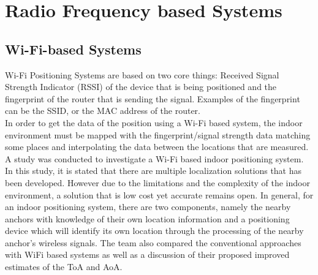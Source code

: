 \documentclass{l4proj}
\begin{document}
\section{Radio Frequency based Systems}
\subsection{Wi-Fi-based Systems}
Wi-Fi Positioning Systems are based on two core things: Received Signal Strength Indicator (RSSI) of the device that is being positioned and the fingerprint of the router that is sending the signal. Examples of the fingerprint can be the SSID, or the MAC address of the router.\\

In order to get the data of the position using a Wi-Fi based system, the indoor environment must be mapped with the fingerprint/signal strength data matching some places and interpolating the data between the locations that are measured.\\

A study was conducted to investigate a Wi-Fi based indoor positioning system. In this study, it is stated that there are multiple localization solutions that has been developed. However due to the limitations and the complexity of the indoor environment, a solution that is low cost yet accurate remains open. In general,  for an indoor positioning system, there are two components, namely the nearby anchors with knowledge of their own location information and a positioning device which will identify its own location through the processing of the nearby anchor's wireless signals.\cite{wifibased} The team also compared the conventional approaches with WiFi based systems as well as a discussion of their proposed improved estimates of the ToA and AoA.\\
\end{document}
